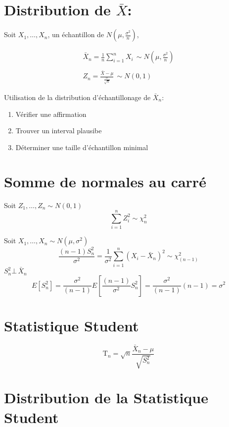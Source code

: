 \documentclass[]{book}
\providecommand{\tightlist}{%
  \setlength{\itemsep}{0pt}\setlength{\parskip}{0pt}}
\theoremstyle{definition}
\theoremstyle{definition}
\theoremstyle{definition}
\theoremstyle{remark}
\begin{document}
\section{\texorpdfstring{Distribution de
\(\bar{X}\):}{Distribution de \textbackslash{}bar\{X\}:}}\label{distribution-de-barx}

Soit \(X_1,\dots,X_n\), un échantillon de \(N(\mu,\frac{\sigma^2}{n})\),

\begin{gather*}
    \bar{X}_n=\frac{1}{n}\sum_{i=1}^n X_i\, \sim N\left(\mu,\frac{\sigma^2}{n}\right)\\
    \\
    Z_n=\frac{\bar{X}-\mu}{\frac{\sigma}{\sqrt{n}}}\,\sim N(0,1)
\end{gather*}

Utilisation de la distribution d'échantillonage de \(\bar{X}_n\):

\begin{enumerate}
\def\labelenumi{\arabic{enumi}.}
\tightlist
\item
  Vérifier une affirmation
\item
  Trouver un interval plausibe
\item
  Déterminer une taille d'échantillon minimal
\end{enumerate}

\section{Somme de normales au carré}\label{somme-de-normales-au-carre}

Soit \(Z_1,\dots,Z_n\sim N(0,1)\) \[
\sum_{i=1}^n Z_i^2\sim \chi^2_n
\]

Soit \(X_1,\dots,X_n\sim N(\mu,\sigma^2)\) \[
\frac{(n-1)S^2_n}{\sigma^2}= \frac{1}{\sigma^2}\sum^n_{i=1}(X_i-\bar{X}_n)^2\sim \chi^2_{(n-1)}
\] \(S^2_n\bot\,\bar{X}_n\) \[
E[S^2_n]= \frac{\sigma^2}{(n-1)}E\left[\frac{(n-1)}{\sigma^2}S^2_n\right]=\frac{\sigma^2}{(n-1)}(n-1)=\sigma^2
\]

\section{Statistique Student}\label{stats:stats:student}

\[
\text{T}_n= \sqrt{n}\frac{\bar{X}_n-\mu}{\sqrt{S_n^2}}
\]

\section{Distribution de la Statistique
Student}\label{stats:dist:student}
\end{document}
